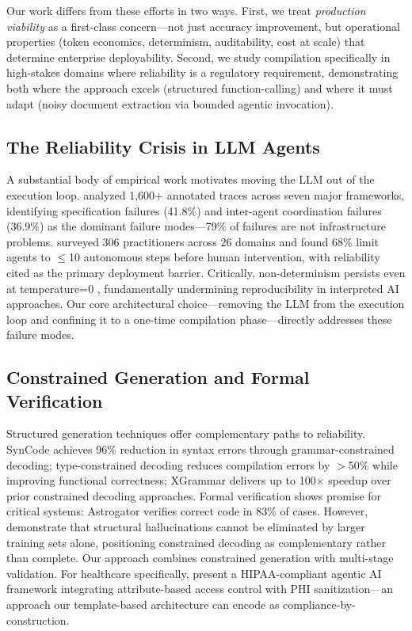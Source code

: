 \documentclass[11pt]{article}
\begin{document}
Our work differs from these efforts in two ways. First, we treat \emph{production viability} as a first-class concern---not just accuracy improvement, but operational properties (token economics, determinism, auditability, cost at scale) that determine enterprise deployability. Second, we study compilation specifically in high-stakes domains where reliability is a regulatory requirement, demonstrating both where the approach excels (structured function-calling) and where it must adapt (noisy document extraction via bounded agentic invocation).

\subsection{The Reliability Crisis in LLM Agents}
\label{sec:related-reliability}

A substantial body of empirical work motivates moving the LLM out of the execution loop. \citet{cemri2025multiagent} analyzed 1,600+ annotated traces across seven major frameworks, identifying specification failures (41.8\%) and inter-agent coordination failures (36.9\%) as the dominant failure modes---79\% of failures are not infrastructure problems. \citet{pan2025measuring} surveyed 306 practitioners across 26 domains and found 68\% limit agents to $\leq$10 autonomous steps before human intervention, with reliability cited as the primary deployment barrier. Critically, non-determinism persists even at temperature=0 \citep{ouyang2023nondeterminism, atil2024nondeterminism}, fundamentally undermining reproducibility in interpreted AI approaches. Our core architectural choice---removing the LLM from the execution loop and confining it to a one-time compilation phase---directly addresses these failure modes.

\subsection{Constrained Generation and Formal Verification}
\label{sec:related-constrained}

Structured generation techniques offer complementary paths to reliability. SynCode \citep{ugare2024syncode} achieves 96\% reduction in syntax errors through grammar-constrained decoding; type-constrained decoding \citep{mundler2025typeconstrained} reduces compilation errors by $>$50\% while improving functional correctness; XGrammar \citep{dong2024xgrammar} delivers up to 100$\times$ speedup over prior constrained decoding approaches. Formal verification shows promise for critical systems: Astrogator \citep{councilman2025astrogator} verifies correct code in 83\% of cases. However, \citet{xu2024hallucination} demonstrate that structural hallucinations cannot be eliminated by larger training sets alone, positioning constrained decoding as complementary rather than complete. Our approach combines constrained generation with multi-stage validation. For healthcare specifically, \citet{neupane2025hipaa} present a HIPAA-compliant agentic AI framework integrating attribute-based access control with PHI sanitization---an approach our template-based architecture can encode as compliance-by-construction.
\end{document}
